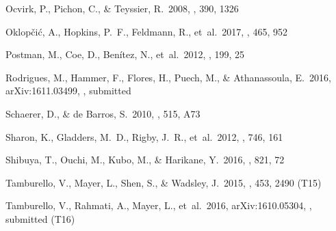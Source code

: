 \documentclass[twocolumn]{aastex61}
\begin{document}
\begin{thebibliography}{}


Ocvirk, P., Pichon, C., \& Teyssier, R.\ 2008, \mnras, 390, 1326

Oklop\v{c}i\'{c}, A., Hopkins, P.~F., Feldmann, R., et~al.\ 2017, \mnras, 465, 952

Postman, M., Coe, D., Ben\'{i}tez, N., et~al.\ 2012, \apjs, 199, 25  


Rodrigues, M., Hammer, F., Flores, H., Puech, M., \& Athanassoula, E.\ 2016, arXiv:1611.03499, \mnras, submitted




Schaerer, D., \& de Barros, S.\ 2010, \aap, 515, A73

Sharon, K., Gladders, M.~D., Rigby, J.~R., et~al.\ 2012, \apj, 746, 161 


Shibuya, T., Ouchi, M., Kubo, M., \& Harikane, Y.\ 2016, \apj, 821, 72


Tamburello, V., Mayer, L., Shen, S., \& Wadsley, J.\ 2015, \mnras, 453, 2490 (T15)

Tamburello, V., Rahmati, A., Mayer, L., et~al.\ 2016, arXiv:1610.05304, \mnras, submitted (T16)


\end{thebibliography}
\end{document}

